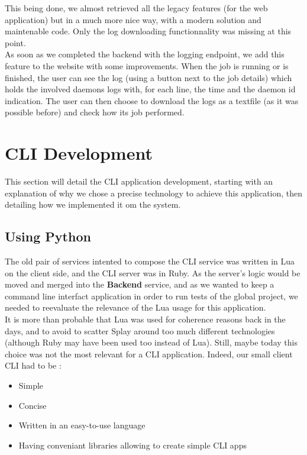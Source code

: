\documentclass{eplmastersthesis}
\begin{document}
        This being done, we almost retrieved all the legacy features (for the
        web application) but in a much more nice way, with a modern solution
        and maintenable code. Only the log downloading functionnality was
        missing at this point. \\
        As soon as we completed the backend with the logging endpoint, we
        add this feature to the website with some improvements. When the
        job is running or is finished, the user can see the log (using a
        button next to the job details) which holds the involved daemons logs
        with, for each line, the time and the daemon id indication. The user
        can then choose to download the logs as a textfile (as it was possible
        before) and check how its job performed.

    \section{CLI Development}

      This section will detail the CLI application development, starting
      with an explanation of why we chose a precise technology to achieve
      this application, then detailing how we implemented it om the system.

      \subsection{Using Python}

        The old pair of services intented to compose the CLI service was
        written in Lua on the client side, and the CLI server was in Ruby. As
        the server's logic would be moved and merged into the \textbf{Backend}
        service, and as we wanted to keep a command line interfact application
        in order to run tests of the global project, we needed to reevaluate
        the relevance of the Lua usage for this application.\\

        It is more than probable that Lua was used for coherence reasons back
        in the days, and to avoid to scatter Splay around too much different
        technologies (although Ruby may have been used too instead of Lua).
        Still, maybe today this choice was not the most relevant for a CLI
        application. Indeed, our small client CLI had to be :

        \begin{itemize}
          \item Simple
          \item Concise
          \item Written in an easy-to-use language
          \item Having conveniant libraries allowing to create simple CLI apps
        \end{itemize}
\end{document}
